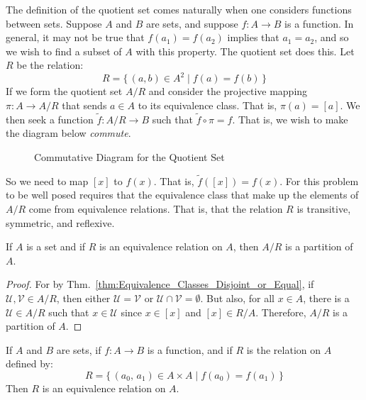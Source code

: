     \begin{example}
        The definition of the quotient set comes naturally when one considers
        functions between sets. Suppose $A$ and $B$ are sets, and suppose
        $f:A\rightarrow{B}$ is a function. In general, it may not be true that
        $f(a_{1})=f(a_{2})$ implies that $a_{1}=a_{2}$, and so we wish to find a
        subset of $A$ with this property. The quotient set does this. Let
        $R$ be the relation:
        \begin{equation}
            R=\{\,(a,b)\in{A}^{2}\;|\;f(a)=f(b)\,\}
        \end{equation}
        If we form the quotient set $A/R$ and consider the projective mapping
        $\pi:A\rightarrow{A}/R$ that sends $a\in{A}$ to its equivalence class.
        That is, $\pi(a)=[a]$. We then seek a function
        $\tilde{f}:A/R\rightarrow{B}$ such that $\tilde{f}\circ{\pi}=f$.
        That is, we wish to make the diagram below \textit{commute}.
        \begin{figure}[H]
            \centering
            \label{fig:Comm_Diagram_Quotient_Set}
            \caption{Commutative Diagram for the Quotient Set}
        \end{figure}
        So we need to map $[x]$ to $f(x)$. That is, $\tilde{f}([x])=f(x)$. For
        this problem to be well posed requires that the equivalence class that
        make up the elements of $A/R$ come from equivalence relations. That is,
        that the relation $R$ is transitive, symmetric, and reflexive.
    \end{example}
    \begin{theorem}
        If $A$ is a set and if $R$ is an equivalence relation on $A$, then
        $A/R$ is a partition of $A$.
    \end{theorem}
    \begin{proof}
        For by Thm.~\ref{thm:Equivalence_Classes_Disjoint_or_Equal}, if
        $\mathcal{U},\mathcal{V}\in{A}/R$, then either
        $\mathcal{U}=\mathcal{V}$ or $\mathcal{U}\cap\mathcal{V}=\emptyset$.
        But also, for all $x\in{A}$, there is a $\mathcal{U}\in{A}/R$ such that
        $x\in\mathcal{U}$ since $x\in[x]$ and $[x]\in{R}/A$. Therefore,
        $A/R$ is a partition of $A$.
    \end{proof}
    \begin{theorem}
        If $A$ and $B$ are sets, if $f:A\rightarrow{B}$ is a function, and if
        $R$ is the relation on $A$ defined by:
        \begin{equation}
            R=\{\,(a_{0},\,a_{1})\in{A}\times{A}\;|\;f(a_{0})=f(a_{1})\,\}
        \end{equation}
        Then $R$ is an equivalence relation on $A$.
    \end{theorem}
